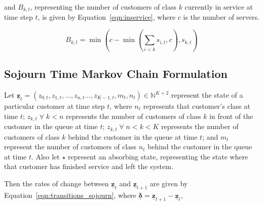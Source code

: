 \documentclass{article}
\begin{document}
and $B_{k,t}$, representing the number of customers of class $k$ currently in
service at time step $t$, is given by Equation~\ref{eqn:inservice}, where $c$
is the number of servers.

\begin{equation}\label{eqn:inservice}
B_{k,t} =\min\left(c - \min\left(\sum_{i < k} s_{i,t}, c\right), s_{k,t}\right)
\end{equation}




\subsection{Sojourn Time Markov Chain Formulation}\label{sec:sojourn_formulation}
Let $\underline{\mathbf{z}}_t = (z_{0,t}, z_{1,t}, \dots, z_{n,t} \dots, z_{K-1,t}, m_t, n_t) \in \mathbb{N}^{K+2}$
represent the state of a particular customer at time step $t$, where $n_t$
represents that customer's class at time $t$; $z_{k,t} \; \forall \; k < n$
represents the number of customers of class $k$ in front of the customer in the
queue at time $t$; $z_{k,t} \; \forall \; n < k < K$ represents the number of
customers of class $k$ behind the customer in the queue at time $t$; and $m_t$
represent the number of customers of class $n_t$ behind the customer in the
queue at time $t$.
Also let $\star$ represent an absorbing state, representing the state where that
customer has finished service and left the system.

Then the rates of change between $\underline{\mathbf{z}}_t$ and
$\underline{\mathbf{z}}_{t+1}$ are given by Equation~\ref{eqn:transitions_sojourn},
where $\underline{\mathbf{\delta}} = \underline{\mathbf{z}}_{t+1} - \underline{\mathbf{z}}_t$,
\end{document}

